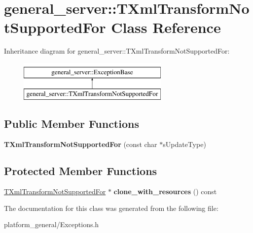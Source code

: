 \hypertarget{classgeneral__server_1_1TXmlTransformNotSupportedFor}{\section{general\-\_\-server\-:\-:\-T\-Xml\-Transform\-Not\-Supported\-For \-Class \-Reference}
\label{classgeneral__server_1_1TXmlTransformNotSupportedFor}
}
\-Inheritance diagram for general\-\_\-server\-:\-:\-T\-Xml\-Transform\-Not\-Supported\-For\-:\begin{figure}[H]
\begin{center}
\leavevmode
\includegraphics[height=2.000000cm]{classgeneral__server_1_1TXmlTransformNotSupportedFor}
\end{center}
\end{figure}
\subsection*{\-Public \-Member \-Functions}
\begin{DoxyCompactItemize}
\item 
\hypertarget{classgeneral__server_1_1TXmlTransformNotSupportedFor_a00bf5561223a9e2bbdd46fbd12101679}{{\bfseries \-T\-Xml\-Transform\-Not\-Supported\-For} (const char $\ast$s\-Update\-Type)}\label{classgeneral__server_1_1TXmlTransformNotSupportedFor_a00bf5561223a9e2bbdd46fbd12101679}

\end{DoxyCompactItemize}
\subsection*{\-Protected \-Member \-Functions}
\begin{DoxyCompactItemize}
\item 
\hypertarget{classgeneral__server_1_1TXmlTransformNotSupportedFor_a254e3a6122558cf780aae3a277c2bcf8}{\hyperlink{classgeneral__server_1_1TXmlTransformNotSupportedFor}{\-T\-Xml\-Transform\-Not\-Supported\-For} $\ast$ {\bfseries clone\-\_\-with\-\_\-resources} () const }\label{classgeneral__server_1_1TXmlTransformNotSupportedFor_a254e3a6122558cf780aae3a277c2bcf8}

\end{DoxyCompactItemize}


\-The documentation for this class was generated from the following file\-:\begin{DoxyCompactItemize}
\item 
platform\-\_\-general/\-Exceptions.\-h\end{DoxyCompactItemize}
